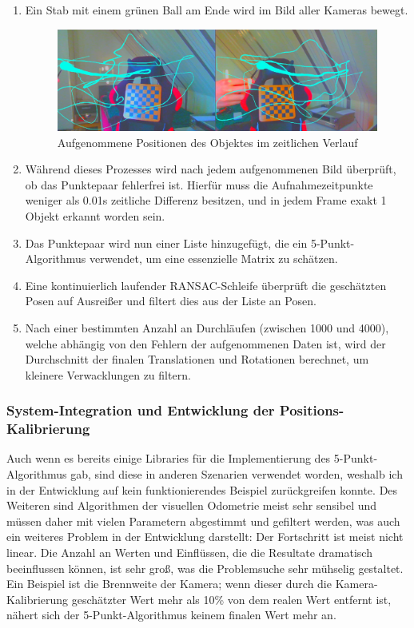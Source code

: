 \documentclass[12pt, ngerman]{article}
\begin{document}
\begin{enumerate}
  \item Ein Stab mit einem grünen Ball am Ende wird im Bild aller Kameras bewegt.
  \vspace{10pt}
  \begin{figure}[hbtp!]
      \includegraphics[width=\textwidth]{crack.png}
      \caption{Aufgenommene Positionen des Objektes im zeitlichen Verlauf}
      \label{Abb: wand}
  \end{figure}
  
  \item Während dieses Prozesses wird nach jedem aufgenommenen Bild überprüft, ob das Punktepaar fehlerfrei ist. Hierfür muss die Aufnahmezeitpunkte weniger als 0.01s zeitliche Differenz besitzen, und in jedem Frame exakt 1 Objekt erkannt worden sein.
  \item Das Punktepaar wird nun einer Liste hinzugefügt, die ein 5-Punkt-Algorithmus verwendet, um eine essenzielle Matrix zu schätzen. 
  \item Eine kontinuierlich laufender RANSAC-Schleife überprüft die geschätzten Posen auf Ausreißer und filtert dies aus der Liste an Posen.
  \item Nach einer bestimmten Anzahl an Durchläufen (zwischen 1000 und 4000), welche abhängig von den Fehlern der aufgenommenen Daten ist, wird der Durchschnitt der finalen Translationen und Rotationen berechnet, um kleinere Verwacklungen zu filtern.
\end{enumerate}

\subsubsection{System-Integration und Entwicklung der Positions-Kalibrierung}
Auch wenn es bereits einige Libraries für die Implementierung des 5-Punkt-Algorithmus gab, sind diese in anderen Szenarien verwendet worden, weshalb ich in der Entwicklung auf kein funktionierendes Beispiel zurückgreifen konnte. Des Weiteren sind Algorithmen der visuellen Odometrie meist sehr sensibel und müssen daher mit vielen Parametern abgestimmt und gefiltert werden, was auch ein weiteres Problem in der Entwicklung darstellt: Der Fortschritt ist meist nicht linear. Die Anzahl an Werten und Einflüssen, die die Resultate dramatisch beeinflussen können, ist sehr groß, was die Problemsuche sehr mühselig gestaltet. Ein Beispiel ist die Brennweite der Kamera; wenn dieser durch die Kamera-Kalibrierung geschätzter Wert mehr als 10\% von dem realen Wert entfernt ist, nähert sich der 5-Punkt-Algorithmus keinem finalen Wert mehr an. 
\end{document}

